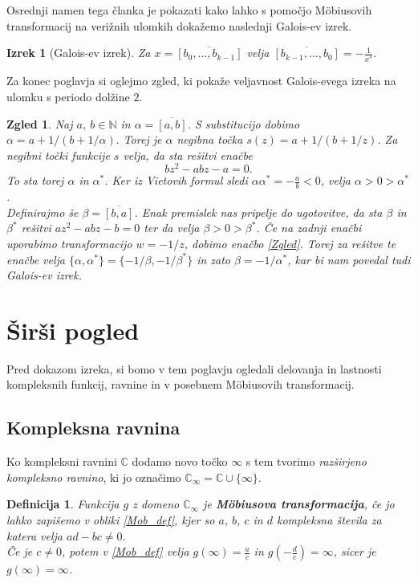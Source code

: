 \documentclass[a4paper,12pt]{article}
\def\N{\mathbb{N}} %
\def\C{\mathbb{C}} %
\def\Ci{\mathbb{C}_{\infty}} %
\newtheorem*{izrek}{Izrek}
\newtheorem{definicija}{Definicija}
\newtheorem{zgled}{Zgled}
\begin{document}
Osrednji namen tega članka je pokazati kako lahko s pomočjo M\"{o}biusovih transformacij na verižnih ulomkih dokažemo naslednji Galois-ev izrek.

\begin{izrek}[Galois-ev izrek]
    \label{Galois}
	Za $x = \overline{[b_0, \ldots, b_{k-1}]}$ velja $\overline{[b_{k-1}, \ldots, b_0]} = - \frac{1}{x^*}.$
\end{izrek}

Za konec poglavja si oglejmo zgled, ki pokaže veljavnost Galois-evega izreka na ulomku s periodo dolžine $2$.

\begin{zgled}
Naj $a,\ b \in \N$ in $\alpha = \overline{[a, b]}$. S substitucijo dobimo $\alpha = a + 1/(b + 1/\alpha).$ Torej je $\alpha$ negibna točka $s(z) = a + 1/(b + 1/z)$. Za negibni točki funkcije $s$ velja, da sta rešitvi enačbe 
\begin{equation}
    \label{Zgled}
    bz^2 - abz - a = 0.
\end{equation}
To sta torej $\alpha$ in $\alpha^*$. Ker iz Vietovih formul sledi $\alpha\alpha^* = - \frac{a}{b} < 0$, velja $\alpha > 0 > \alpha^*$.\\
Definirajmo še $\beta = \overline{[b, a]}$. Enak premislek nas pripelje do ugotovitve, da sta $\beta$ in $\beta^*$ rešitvi $az^2 - abz - b =0$ ter da velja $\beta > 0 > \beta^*$. Če na zadnji enačbi uporabimo transformacijo $w = - 1 / z$, dobimo enačbo \eqref{Zgled}. Torej za rešitve te enačbe velja $\{\alpha, \alpha^*\} = \{-1/\beta, -1/\beta^*\}$ in zato $\beta = -1/\alpha^*$, kar bi nam povedal tudi Galois-ev izrek.
\end{zgled}
\newpage


\section{Širši pogled}
\label{Pogled_pogl}

Pred dokazom izreka, si bomo v tem poglavju ogledali delovanja in lastnosti kompleksnih funkcij, ravnine in v posebnem M\"{o}biusovih transformacij.


\subsection{Kompleksna ravnina}
Ko kompleksni ravnini $\C$ dodamo novo točko $\infty$ s tem tvorimo \emph{razširjeno kompleksno ravnino}, ki jo označimo $\Ci = \C \cup \{\infty\}$.
\begin{definicija}
Funkcija $g$ z domeno $\Ci$ je \textbf{M\"{o}biusova transformacija}, če jo lahko zapišemo v obliki \eqref{Mob_def}, kjer so $a$, $b$, $c$ in $d$ kompleksna števila za katera velja $ad - bc \neq 0$. \\
Če je $c \neq 0$, potem v \eqref{Mob_def} velja $g(\infty) = \frac{a}{c}$ in $g(-\frac{d}{c}) = \infty$, sicer je $g(\infty) = \infty$.
\end{definicija}
\end{document}
